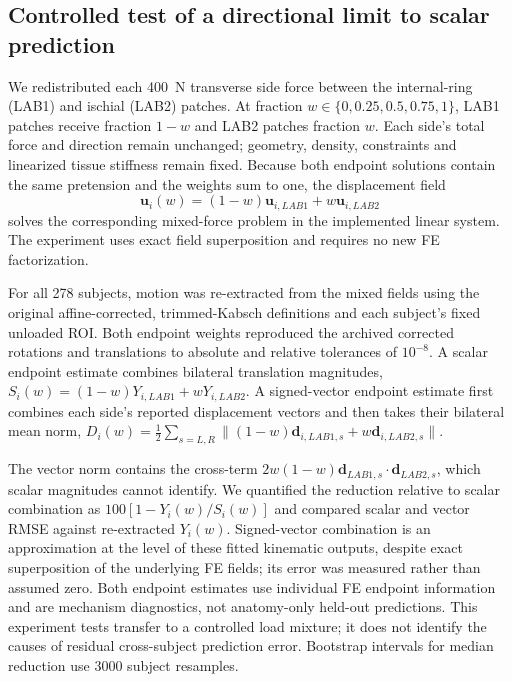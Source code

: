 \subsection{Controlled test of a directional limit to scalar prediction}
We redistributed each 400~N transverse side force between the internal-ring (LAB1) and ischial (LAB2) patches. At fraction $w\in\{0,0.25,0.5,0.75,1\}$, LAB1 patches receive fraction $1-w$ and LAB2 patches fraction $w$. Each side's total force and direction remain unchanged; geometry, density, constraints and linearized tissue stiffness remain fixed. Because both endpoint solutions contain the same pretension and the weights sum to one, the displacement field
\begin{equation}
\mathbf u_i(w)=(1-w)\mathbf u_{i,LAB1}+w\mathbf u_{i,LAB2}
\label{eq:mixture_field}
\end{equation}
solves the corresponding mixed-force problem in the implemented linear system. The experiment uses exact field superposition and requires no new FE factorization.

For all 278 subjects, motion was re-extracted from the mixed fields using the original affine-corrected, trimmed-Kabsch definitions and each subject's fixed unloaded ROI. Both endpoint weights reproduced the archived corrected rotations and translations to absolute and relative tolerances of $10^{-8}$. A scalar endpoint estimate combines bilateral translation magnitudes, $S_i(w)=(1-w)Y_{i,LAB1}+wY_{i,LAB2}$. A signed-vector endpoint estimate first combines each side's reported displacement vectors and then takes their bilateral mean norm, $D_i(w)=\frac12\sum_{s=L,R}\|(1-w)\mathbf d_{i,LAB1,s}+w\mathbf d_{i,LAB2,s}\|$.

The vector norm contains the cross-term $2w(1-w)\mathbf d_{LAB1,s}\cdot\mathbf d_{LAB2,s}$, which scalar magnitudes cannot identify. We quantified the reduction relative to scalar combination as $100[1-Y_i(w)/S_i(w)]$ and compared scalar and vector RMSE against re-extracted $Y_i(w)$. Signed-vector combination is an approximation at the level of these fitted kinematic outputs, despite exact superposition of the underlying FE fields; its error was measured rather than assumed zero. Both endpoint estimates use individual FE endpoint information and are mechanism diagnostics, not anatomy-only held-out predictions. This experiment tests transfer to a controlled load mixture; it does not identify the causes of residual cross-subject prediction error. Bootstrap intervals for median reduction use 3000 subject resamples.

